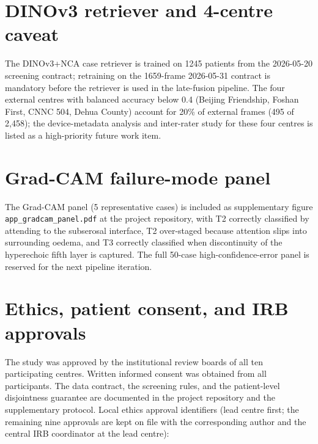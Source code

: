 \documentclass[11pt,a4paper]{article}
\begin{document}
\section{DINOv3 retriever and 4-centre caveat}
\label{app:dinov3}
The DINOv3+NCA case retriever is trained on 1245 patients from the 2026-05-20 screening contract; retraining on the 1659-frame 2026-05-31 contract is mandatory before the retriever is used in the late-fusion pipeline. The four external centres with balanced accuracy below 0.4 (Beijing Friendship, Foshan First, CNNC 504, Dehua County) account for 20\% of external frames (495 of 2{,}458); the device-metadata analysis and inter-rater study for these four centres is listed as a high-priority future work item.

\section{Grad-CAM failure-mode panel}
\label{app:gradcam}
The Grad-CAM panel (5 representative cases) is included as supplementary figure \texttt{app\_gradcam\_panel.pdf} at the project repository, with T2 correctly classified by attending to the subserosal interface, T2 over-staged because attention slips into surrounding oedema, and T3 correctly classified when discontinuity of the hyperechoic fifth layer is captured. The full 50-case high-confidence-error panel is reserved for the next pipeline iteration.

\section{Ethics, patient consent, and IRB approvals}
The study was approved by the institutional review boards of all ten participating centres. Written informed consent was obtained from all participants. The data contract, the screening rules, and the patient-level disjointness guarantee are documented in the project repository and the supplementary protocol. Local ethics approval identifiers (lead centre first; the remaining nine approvals are kept on file with the corresponding author and the central IRB coordinator at the lead centre):
\end{document}
